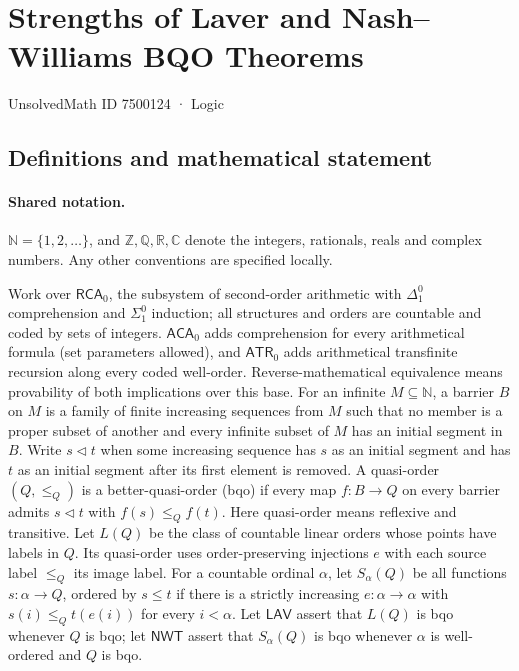 \documentclass[11pt]{article}
\begin{document}
\setcounter{section}{7500123}
\section{Strengths of Laver and Nash–Williams BQO Theorems}\label{7500124}
{\small\sffamily UnsolvedMath ID 7500124 · Logic}
\subsection{Definitions and mathematical statement}

\paragraph{Shared notation.}$\mathbb N=\{1,2,\ldots\}$, and $\mathbb Z,\mathbb Q,\mathbb R,\mathbb C$ denote the integers, rationals, reals and complex numbers. Any other conventions are specified locally.


Work over $\mathsf{RCA}_0$, the subsystem of second-order arithmetic with $\Delta^0_1$ comprehension and $\Sigma^0_1$ induction; all structures and orders are countable and coded by sets of integers. $\mathsf{ACA}_0$ adds comprehension for every arithmetical formula (set parameters allowed), and $\mathsf{ATR}_0$ adds arithmetical transfinite recursion along every coded well-order. Reverse-mathematical equivalence means provability of both implications over this base. For an infinite $M\subseteq\mathbb N$, a barrier $B$ on $M$ is a family of finite increasing sequences from $M$ such that no member is a proper subset of another and every infinite subset of $M$ has an initial segment in $B$. Write $s\triangleleft t$ when some increasing sequence has $s$ as an initial segment and has $t$ as an initial segment after its first element is removed. A quasi-order $(Q,\le_Q)$ is a better-quasi-order (bqo) if every map $f:B\to Q$ on every barrier admits $s\triangleleft t$ with $f(s)\le_Q f(t)$. Here quasi-order means reflexive and transitive. Let $L(Q)$ be the class of countable linear orders whose points have labels in $Q$. Its quasi-order uses order-preserving injections $e$ with each source label $\le_Q$ its image label. For a countable ordinal $\alpha$, let $S_\alpha(Q)$ be all functions $s:\alpha\to Q$, ordered by $s\le t$ if there is a strictly increasing $e:\alpha\to\alpha$ with $s(i)\le_Q t(e(i))$ for every $i<\alpha$. Let $\mathsf{LAV}$ assert that $L(Q)$ is bqo whenever $Q$ is bqo; let $\mathsf{NWT}$ assert that $S_\alpha(Q)$ is bqo whenever $\alpha$ is well-ordered and $Q$ is bqo.
\end{document}

